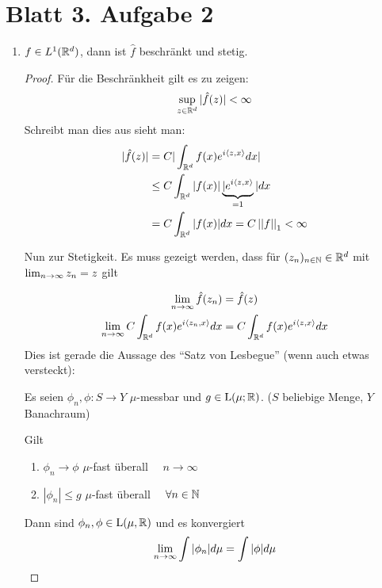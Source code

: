 \documentclass[
 ngerman]{report}
\begin{document}
\section*{Blatt 3. Aufgabe 2}

\begin{enumerate}[1.]
	\item $f \in L^1(\mathbb{R}^d)$, dann ist $\hat{f}$ beschränkt und stetig. 
	\newcommand{\g}{\underbrace{|e^{i \fop{z,x }}}_{= 1}|}
	\newcommand{\vorfaktor}{C} %
	\begin{proof}
		Für die Beschränkheit gilt es zu zeigen:
		$$ \sup_{z\in \mathbb{R}^d} |\hat{f}(z)| < \infty $$
		Schreibt man dies aus sieht man:
		$$ \begin{aligned}
			|\hat{f}(z)| 
			&= \vorfaktor |\int_{\R^d} f(x) e^{i \fop{z,x }} dx|
			\\
			&\leq \vorfaktor \int_{\R^d} |f(x)| \g dx %
			\\
			&= \vorfaktor \int_{\R^d} |f(x)| dx = \vorfaktor \norm{f}_1 < \infty 
		\end{aligned} $$

		Nun zur Stetigkeit. Es muss gezeigt werden, dass für $(z_n)_{n\in\mathbb{N}}\in \mathbb{R}^d$
		mit $\lim_{n \to \infty} z_n = z$ gilt
		
		$$ \begin{aligned}
			\limes \hat{f}(z_n) &= \hat{f}(z)
			\\
			\limes \vorfaktor \int_{\R^d} f(x) e^{i \fop{z_n,x }} dx 
		&= \vorfaktor \int_{\R^d} f(x) e^{i \fop{z,x }} dx 
		\end{aligned}$$	
		Dies ist gerade die Aussage des \enquote{Satz von Lesbegue} 
		(wenn auch etwas versteckt):

		{\scriptsize
			Es seien $\phi_n,\phi: S \to Y$ $\mu$-messbar und $g \in \text{L}(\mu;\mathbb{R})$.
			($S$ beliebige Menge, $Y$ Banachraum)

			Gilt 
			\begin{enumerate}[(1)]
				\item $\phi_n \to \phi$ $\mu$-fast überall $\quad n \to \infty$
			  \item $|\phi_n| \leq g$ $\mu$-fast überall $\quad \forall n\in \mathbb{N}$ 
			\end{enumerate}		

			Dann sind $\phi_n,\phi \in \text{L}(\mu, \mathbb{R})$ und es konvergiert 
			$$\lim_{n \to \infty} \int |\phi_n| d\mu = \int |\phi| d\mu$$
		}
		

\end{proof}
\end{enumerate}
\end{document}
